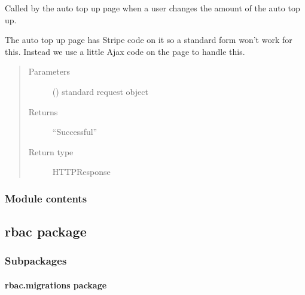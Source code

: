 \documentclass[letterpaper,10pt,english]{sphinxmanual}
\begin{document}
\begin{fulllineitems}
\label{\detokenize{payments:payments.views.update_auto_amount}}
Called by the auto top up page when a user changes the amount of the auto top up.

The auto top up page has Stripe code on it so a standard form won’t work
for this. Instead we use a little Ajax code on the page to handle this.
\begin{quote}\begin{description}
\item[{Parameters}] \leavevmode
{} () \textendash{} standard request object

\item[{Returns}] \leavevmode
“Successful”

\item[{Return type}] \leavevmode
HTTPResponse

\end{description}\end{quote}

\end{fulllineitems}



\subsubsection{Module contents}
\label{\detokenize{payments:module-payments}}\label{\detokenize{payments:module-contents}}

\subsection{rbac package}
\label{\detokenize{rbac:rbac-package}}\label{\detokenize{rbac::doc}}

\subsubsection{Subpackages}
\label{\detokenize{rbac:subpackages}}

\paragraph{rbac.migrations package}
\label{\detokenize{rbac.migrations:rbac-migrations-package}}\label{\detokenize{rbac.migrations::doc}}
\end{document}
